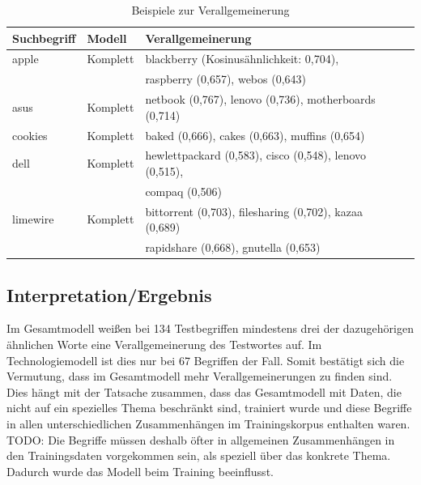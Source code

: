 \documentclass[12pt,a4paper]{report}
\begin{document}
		
		
\begin{table}[H]
\caption{Beispiele zur Verallgemeinerung}
\label{tab:bspVerallgemeinerung}
\begin{center}
\begin{tabular}{|l||l|l|l|l|}
\hline
\textbf{Suchbegriff} & \textbf{Modell} & \textbf{Verallgemeinerung}   \\
\hline
\hline
 apple & Komplett & blackberry (Kosinusähnlichkeit: 0,704),\\
 	&	& raspberry (0,657), webos (0,643)\\
 \hline
 asus	   & Komplett & netbook (0,767), lenovo (0,736), motherboards (0,714) \\
\hline
 cookies	& Komplett& baked (0,666), cakes (0,663), muffins (0,654)\\
 	\hline
 dell	 & Komplett & hewlettpackard (0,583), cisco (0,548), lenovo (0,515),\\
 && compaq (0,506) \\
 \hline
 limewire	& Komplett& bittorrent (0,703), filesharing (0,702), kazaa (0,689)\\
 &&rapidshare (0,668), gnutella (0,653)\\
 	\hline
 	
 	\hline
 	
 
\end{tabular}
\end{center}
\end{table}


  
		\subsection*{Interpretation/Ergebnis}
		Im Gesamtmodell weißen bei 134 Testbegriffen mindestens drei der dazugehörigen ähnlichen Worte eine Verallgemeinerung des Testwortes auf. Im Technologiemodell ist dies nur bei 67 Begriffen der Fall. Somit bestätigt sich die Vermutung, dass im Gesamtmodell mehr Verallgemeinerungen zu finden sind. Dies hängt mit der Tatsache zusammen, dass das Gesamtmodell mit Daten, die nicht auf ein spezielles Thema beschränkt sind, trainiert wurde und diese Begriffe in allen unterschiedlichen Zusammenhängen im Trainingskorpus enthalten waren. \\
		
TODO:		Die Begriffe müssen deshalb öfter in allgemeinen Zusammenhängen in den Trainingsdaten vorgekommen sein, als speziell über das konkrete Thema. Dadurch wurde das Modell beim Training beeinflusst.\\
\end{document}
